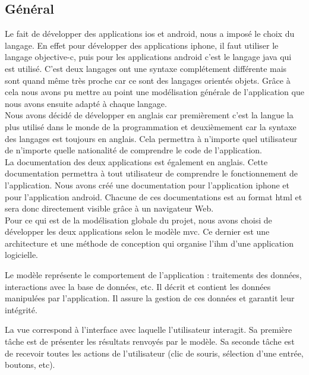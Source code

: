\subsection{Général}
	Le fait de développer des applications \gls{ios} et \gls{android}, nous a imposé le choix du langage. En effet pour développer des applications \gls{iphone}, il faut utiliser le langage \gls{objective-c}, puis  pour les applications \gls{android} c'est le langage \gls{java} qui est utilisé. C'est deux langages ont une syntaxe complétement différente mais sont quand même très proche car ce sont des langages orientés objets. Grâce à cela nous avons pu mettre au point une modélisation générale de l'application que nous avons ensuite adapté à chaque langage.\\
			
	Nous avons décidé de développer en anglais car premièrement c'est la langue la plus utilisé dans le monde de la programmation et deuxièmement car la syntaxe des langages est toujours en anglais. Cela permettra à n'importe quel utilisateur de n'importe quelle nationalité de comprendre le code de l'application.\\
			
	La documentation des deux applications est également en anglais. Cette documentation permettra à tout utilisateur de comprendre le fonctionnement de l'application.
	Nous avons créé une documentation pour l'application \gls{iphone} et pour l'application \gls{android}. Chacune de ces documentations est au format \gls{html} et sera donc directement visible grâce à un navigateur Web.\\
			
	Pour ce qui est de la modélisation globale du projet, nous avons choisi de développer les deux applications selon le modèle \gls{mvc}. Ce dernier est une architecture et une méthode de conception qui organise l'\gls{ihm} d'une application logicielle. 
			
	Le modèle représente le comportement de l'application : traitements des données, interactions avec la base de données, etc. Il décrit et contient les données manipulées par l'application. Il assure la gestion de ces données et garantit leur intégrité.
			
	La vue correspond à l'interface avec laquelle l'utilisateur interagit. Sa première tâche est de présenter les résultats renvoyés par le modèle. Sa seconde tâche est de recevoir toutes les actions de l'utilisateur (clic de souris, sélection d'une entrée, boutons, etc).
			
